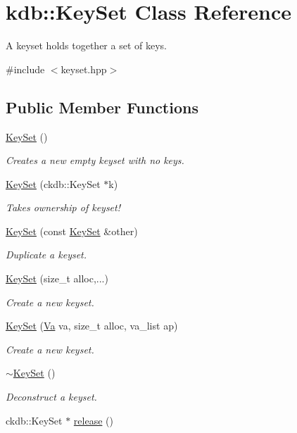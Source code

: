 \hypertarget{classkdb_1_1KeySet}{\section{kdb\-:\-:Key\-Set Class Reference}
\label{classkdb_1_1KeySet}
}


A keyset holds together a set of keys.  




{\ttfamily \#include $<$keyset.\-hpp$>$}

\subsection*{Public Member Functions}
\begin{DoxyCompactItemize}
\item 
\hyperlink{classkdb_1_1KeySet_a4eac9850fa4f06c07a5306befc3e4377}{Key\-Set} ()
\begin{DoxyCompactList}\small\item\em Creates a new empty keyset with no keys. \end{DoxyCompactList}\item 
\hyperlink{classkdb_1_1KeySet_a21f651ff310178951402038e590743e0}{Key\-Set} (ckdb\-::\-Key\-Set $\ast$k)
\begin{DoxyCompactList}\small\item\em Takes ownership of keyset! \end{DoxyCompactList}\item 
\hyperlink{classkdb_1_1KeySet_ad8d6df839ab852fded1739ff3398d0b1}{Key\-Set} (const \hyperlink{classkdb_1_1KeySet}{Key\-Set} \&other)
\begin{DoxyCompactList}\small\item\em Duplicate a keyset. \end{DoxyCompactList}\item 
\hyperlink{classkdb_1_1KeySet_ab4bb5ec4e73eca8ea1bd0a843a6489d4}{Key\-Set} (size\-\_\-t alloc,...)
\begin{DoxyCompactList}\small\item\em Create a new keyset. \end{DoxyCompactList}\item 
\hyperlink{classkdb_1_1KeySet_aacbfb3d02effb6b4c4f141dccae9f232}{Key\-Set} (\hyperlink{structkdb_1_1Va}{Va} va, size\-\_\-t alloc, va\-\_\-list ap)
\begin{DoxyCompactList}\small\item\em Create a new keyset. \end{DoxyCompactList}\item 
\hyperlink{classkdb_1_1KeySet_ade654f92bddec24abad1b651e828f2b8}{$\sim$\-Key\-Set} ()
\begin{DoxyCompactList}\small\item\em Deconstruct a keyset. \end{DoxyCompactList}\item 
\hypertarget{classkdb_1_1KeySet_a2987b3fb1b12196399650726f1c18f02}{ckdb\-::\-Key\-Set $\ast$ \hyperlink{classkdb_1_1KeySet_a2987b3fb1b12196399650726f1c18f02}{release} ()}\label{classkdb_1_1KeySet_a2987b3fb1b12196399650726f1c18f02}


\end{DoxyCompactItemize}
